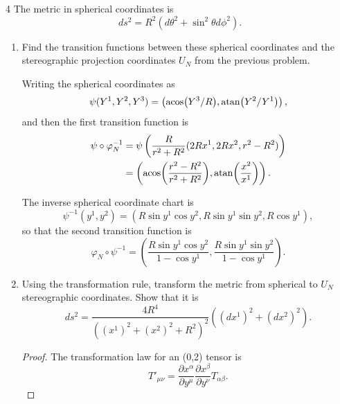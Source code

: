\documentclass[11pt]{article}
\begin{document}
\begin{problem}{4}
	The metric in spherical coordinates is
	\begin{equation}
		\label{eq:5}
		ds^2 = R^2(d\theta^2 + \sin^2\theta d\phi^2).
	\end{equation}

	\begin{enumerate}[label=(\alph*)]
		\item Find the transition functions between these spherical coordinates and the stereographic projection coordinates \( U_N \) from the previous problem.
		      \begin{answer}
			      Writing the spherical coordinates as
			      \begin{equation}
				      \psi(Y^1, Y^2, Y^3) = \left( \acos(Y^3 / R), \atan(Y^2 / Y^1) \right),
			      \end{equation}
            and then the first transition function is
            \begin{equation}
            \label{eq:23}
            \begin{aligned}
              \psi \circ \varphi_N^{-1} &= \psi \left( \frac{R}{r^2 + R^2}(2R x^1, 2R x^2, r^2 - R^2) \right) \\
              &= \left( \acos(\frac{r^2 - R^2}{r^2 + R^2}), \atan(\frac{x^2}{x^{1}}) \right).
            \end{aligned}
          \end{equation}

          The inverse spherical coordinate chart is
          \begin{equation}
          \label{eq:34}
          \psi^{-1}(y^1, y^2) = \left( R\sin y^1 \cos y^2, R \sin y^1 \sin y^2, R \cos y^1 \right),
        \end{equation}
        so that the second transition function is
        \begin{equation}
        \label{eq:35}
        \varphi_N \circ \psi^{-1} = \left( \frac{R\sin y^{1} \cos y^2}{1 - \cos y^{1}}, \frac{R\sin y^1 \sin y^2}{1 - \cos y^{1}} \right).
        \end{equation}
		      \end{answer}
		\item Using the transformation rule, transform the metric from spherical to \( U_N \) stereographic coordinates.
		      Show that it is
		      \begin{equation}
			      \label{eq:6}
			      ds^2 = \frac{4R^4}{((x^1)^2 + (x^2)^2 + R^2)^2}((dx^1)^2 + (dx^2)^2).
		      \end{equation}
\begin{proof}
    The transformation law for an (0,2) tensor is
    \begin{equation}
        \label{eq:metric-transformation}
        T'_{\mu\nu}
        = \frac{\partial x^\alpha}{\partial y^{\mu}}
          \frac{\partial x^\beta}{\partial y^{\nu}}
          T_{\alpha\beta}.
        \end{equation}


\end{proof}
\end{enumerate}
\end{problem}
\end{document}
